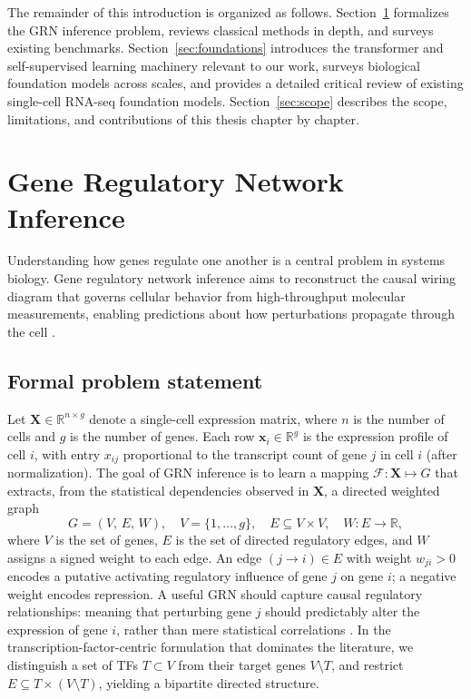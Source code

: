 \bigskip
The remainder of this introduction is organized as follows. Section~\ref{sec:grn} formalizes the
\gls{GRN} inference problem, reviews classical methods in depth, and surveys existing benchmarks.
Section~\ref{sec:foundations} introduces the transformer and self-supervised learning machinery
relevant to our work, surveys biological foundation models across scales, and provides a detailed
critical review of existing single-cell \gls{RNA-seq} foundation models. Section~\ref{sec:scope}
describes the scope, limitations, and contributions of this thesis chapter by chapter.

\section{Gene Regulatory Network Inference}
\label{sec:grn}

Understanding how genes regulate one another is a central problem in systems biology. Gene regulatory network inference aims to reconstruct the causal wiring diagram that governs cellular behavior from high-throughput molecular measurements, enabling predictions about how perturbations propagate through the cell \cite{badia-i-mompelGeneRegulatoryNetwork2023, huynh-thuInferringRegulatoryNetworks2010}.

\subsection{Formal problem statement}

Let \(\mathbf{X} \in \mathbb{R}^{n \times g}\) denote a single-cell expression matrix, where \(n\)
is the number of cells and \(g\) is the number of genes. Each row \(\mathbf{x}_i \in
\mathbb{R}^{g}\) is the expression profile of cell \(i\), with entry \(x_{ij}\) proportional to
the transcript count of gene \(j\) in cell \(i\) (after normalization). The goal of \gls{GRN}
inference is to learn a mapping \(\mathcal{F}: \mathbf{X} \mapsto G\) that extracts, from the
statistical dependencies observed in \(\mathbf{X}\), a directed weighted graph
\begin{equation}
  G = (V,\, E,\, W), \quad V = \{1,\ldots,g\},\quad
  E \subseteq V \times V,\quad W: E \to \mathbb{R},
\end{equation}
where \(V\) is the set of genes, \(E\) is the set of directed regulatory edges, and \(W\) assigns
a signed weight to each edge. An edge \((j \to i) \in E\) with weight \(w_{ji} > 0\) encodes a
putative activating regulatory influence of gene \(j\) on gene \(i\); a negative weight encodes
repression. A useful \gls{GRN} should capture causal regulatory relationships: meaning that
perturbing gene \(j\) should predictably alter the expression of gene \(i\), rather than mere
statistical correlations \cite{pearlTheoreticalImpedimentsMachine2018}. In the transcription-factor-centric formulation that dominates the literature, we
distinguish a set of \glspl{TF} \(T \subset V\) from their target genes \(V \setminus T\), and
restrict \(E \subseteq T \times (V \setminus T)\), yielding a bipartite directed structure.

